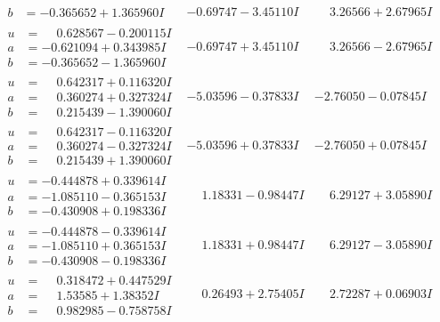 \documentclass[1p]{elsarticle_modified}
\theoremstyle{definition}
\begin{document}
$$\begin{array}{c|c|c}
\begin{aligned}
b &= -0.365652 + 1.365960 I\end{aligned}
 & -0.69747 - 3.45110 I & \phantom{-}3.26566 + 2.67965 I \\ \hline\begin{aligned}
u &= \phantom{-}0.628567 - 0.200115 I \\
a &= -0.621094 + 0.343985 I \\
b &= -0.365652 - 1.365960 I\end{aligned}
 & -0.69747 + 3.45110 I & \phantom{-}3.26566 - 2.67965 I \\ \hline\begin{aligned}
u &= \phantom{-}0.642317 + 0.116320 I \\
a &= \phantom{-}0.360274 + 0.327324 I \\
b &= \phantom{-}0.215439 - 1.390060 I\end{aligned}
 & -5.03596 - 0.37833 I & -2.76050 - 0.07845 I \\ \hline\begin{aligned}
u &= \phantom{-}0.642317 - 0.116320 I \\
a &= \phantom{-}0.360274 - 0.327324 I \\
b &= \phantom{-}0.215439 + 1.390060 I\end{aligned}
 & -5.03596 + 0.37833 I & -2.76050 + 0.07845 I \\ \hline\begin{aligned}
u &= -0.444878 + 0.339614 I \\
a &= -1.085110 - 0.365153 I \\
b &= -0.430908 + 0.198336 I\end{aligned}
 & \phantom{-}1.18331 - 0.98447 I & \phantom{-}6.29127 + 3.05890 I \\ \hline\begin{aligned}
u &= -0.444878 - 0.339614 I \\
a &= -1.085110 + 0.365153 I \\
b &= -0.430908 - 0.198336 I\end{aligned}
 & \phantom{-}1.18331 + 0.98447 I & \phantom{-}6.29127 - 3.05890 I \\ \hline\begin{aligned}
u &= \phantom{-}0.318472 + 0.447529 I \\
a &= \phantom{-}1.53585 + 1.38352 I \\
b &= \phantom{-}0.982985 - 0.758758 I\end{aligned}
 & \phantom{-}0.26493 + 2.75405 I & \phantom{-}2.72287 + 0.06903 I \\ \hline\begin{aligned}

\end{aligned}
\end{array}$$
\end{document}

